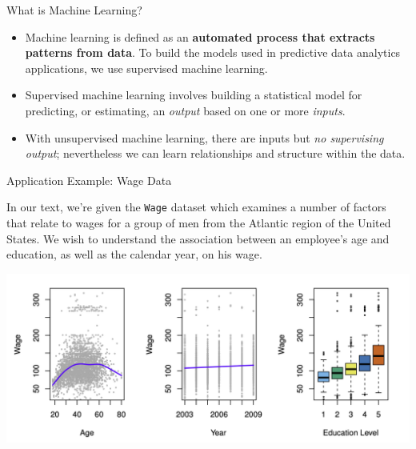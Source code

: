 \documentclass[aspectratio=169,xcolor=dvipsnames]{beamer}
\begin{document}


\begin{frame}{What is Machine Learning?}
\begin{itemize}
\setlength{\itemsep}{.25cm}
\item Machine learning is defined as an \textbf{automated process that extracts patterns from data}. To
build the models used in predictive data analytics applications, we use supervised
machine learning.

\item Supervised machine learning involves building a statistical model for predicting, or estimating, an \textit{output} based on one or more \textit{inputs}.

\item With unsupervised machine learning, there are inputs but \textit{no supervising output}; nevertheless we can learn relationships and structure within the data.
\end{itemize}
\end{frame}


\begin{frame}{Application Example: Wage Data}

In our text, we're given the \texttt{Wage} dataset which examines a number of factors that relate to wages for a group of men from the Atlantic region of the United States. We wish to understand the association between an employee’s age and education, as well as the calendar year, on his wage.
\vspace{.5cm}

\begin{center}
\includegraphics[scale=0.5]{images/wage_figs.png}
\end{center}

\end{frame}
\end{document}
